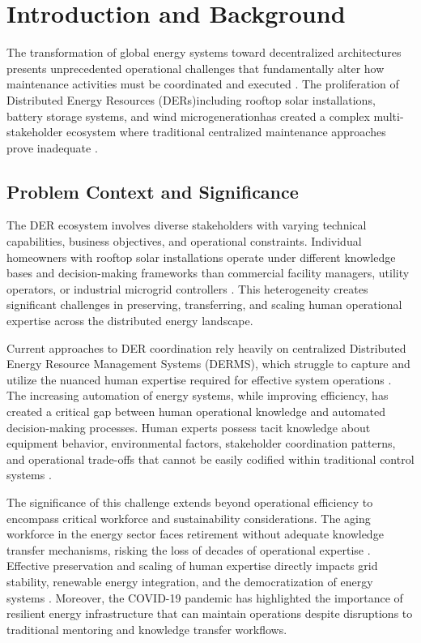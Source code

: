 \documentclass[12pt,a4paper]{article}
\newcommand{\emdash}{\textemdash}
\begin{document}
\newpage

\clearpage

\section{Introduction and Background}
\label{sec:introduction}

The transformation of global energy systems toward decentralized architectures presents unprecedented operational challenges that fundamentally alter how maintenance activities must be coordinated and executed \cite{10.1109/ACCESS.2024.3387400}. The proliferation of Distributed Energy Resources (DERs)\emdash{}including rooftop solar installations, battery storage systems, and wind microgeneration\emdash{}has created a complex multi-stakeholder ecosystem where traditional centralized maintenance approaches prove inadequate \cite{10.1016/j.rser.2020.110607}.

\subsection{Problem Context and Significance}

The DER ecosystem involves diverse stakeholders with varying technical capabilities, business objectives, and operational constraints. Individual homeowners with rooftop solar installations operate under different knowledge bases and decision-making frameworks than commercial facility managers, utility operators, or industrial microgrid controllers \cite{10.1016/j.seta.2022.102837}. This heterogeneity creates significant challenges in preserving, transferring, and scaling human operational expertise across the distributed energy landscape.

Current approaches to DER coordination rely heavily on centralized Distributed Energy Resource Management Systems (DERMS), which struggle to capture and utilize the nuanced human expertise required for effective system operations \cite{10.1049/iet-gtd.2019.1022}. The increasing automation of energy systems, while improving efficiency, has created a critical gap between human operational knowledge and automated decision-making processes. Human experts possess tacit knowledge about equipment behavior, environmental factors, stakeholder coordination patterns, and operational trade-offs that cannot be easily codified within traditional control systems \cite{10.1080/095281300146308}.

The significance of this challenge extends beyond operational efficiency to encompass critical workforce and sustainability considerations. The aging workforce in the energy sector faces retirement without adequate knowledge transfer mechanisms, risking the loss of decades of operational expertise \cite{10.1109/ETFA61755.2024.10711109}. Effective preservation and scaling of human expertise directly impacts grid stability, renewable energy integration, and the democratization of energy systems \cite{10.3390/en14154579}. Moreover, the COVID-19 pandemic has highlighted the importance of resilient energy infrastructure that can maintain operations despite disruptions to traditional mentoring and knowledge transfer workflows.
\end{document}
